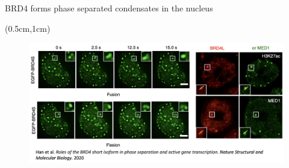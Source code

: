 \documentclass{beamer}					%
\begin{document}

\begin{frame}{BRD4 forms phase separated condensates in the nucleus}
\begin{textblock*}{14cm}(0.5cm,1cm)
\begin{figure}
\includegraphics[width=14cm]{Fission.png}
\end{figure}
\end{textblock*}
\end{frame}
\end{document}
